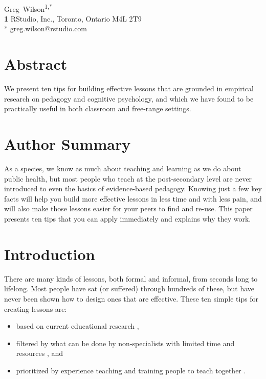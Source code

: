 \documentclass[10pt,letterpaper]{article}
\begin{document}
\vspace*{0.2in}

\begin{flushleft}
{\Large
\textbf{}
}
\newline
\\
{Greg~Wilson}\textsuperscript{1,*}
\\
\textbf{1} RStudio, Inc., Toronto, Ontario M4L 2T9
\\
\bigskip
* greg.wilson@rstudio.com
\end{flushleft}

\section*{Abstract}

We present ten tips for building effective lessons that are grounded in
empirical research on pedagogy and cognitive psychology, and which we have found
to be practically useful in both classroom and free-range settings.

\section*{Author Summary}

As a species, we know as much about teaching and learning as we do about public
health, but most people who teach at the post-secondary level are never
introduced to even the basics of evidence-based pedagogy.  Knowing just a few
key facts will help you build more effective lessons in less time and with less
pain, and will also make those lessons easier for your peers to find and re-use.
This paper presents ten tips that you can apply immediately and explains why
they work.

\section*{Introduction}

There are many kinds of lessons, both formal and informal, from seconds long to
lifelong.  Most people have sat (or suffered) through hundreds of these, but
have never been shown how to design ones that are effective.  These ten simple
tips for creating lessons are:

\begin{itemize}

\item based on current educational research \cite{Nuth2007,Ambr2010,DeBr2015,Dida2016,Brow2018,Mark2018},

\item filtered by what can be done by non-specialists with limited time and
  resources \cite{Hust2012,Lang2016}, and

\item prioritized by experience teaching and training people to teach together
  \cite{Deve2018,Wils2016,Wils2018}.

\end{itemize}
\end{document}
